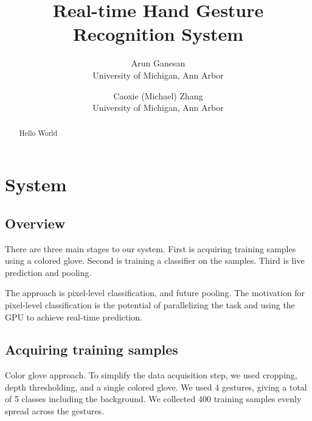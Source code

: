 \documentclass[letterpaper,twocolumn,10pt]{article}
\begin{document}
\date{}

\title{\Large \bf Real-time Hand Gesture Recognition System}

\author{
{\rm Arun Ganesan}\\
University of Michigan, Ann Arbor
\and
{\rm Caoxie (Michael) Zhang}\\
University of Michigan, Ann Arbor
} %

\maketitle

\thispagestyle{empty}

\begin{abstract}
Hello World
\end{abstract}



\section{System}
\subsection{Overview}
There are three main stages to our system. First is acquiring training samples using a colored glove. Second is training a classifier on the samples. Third is live prediction and pooling. 

The approach is pixel-level classification, and future pooling. The motivation for pixel-level classification is the potential of parallelizing the task and using the GPU to achieve real-time prediction. 

\subsection{Acquiring training samples}
Color glove approach. To simplify the data acquisition step, we used cropping, depth thresholding, and a single colored glove. We used 4 gestures, giving a total of 5 classes including the background. We collected 400 training samples evenly spread across the gestures.  
\end{document}
